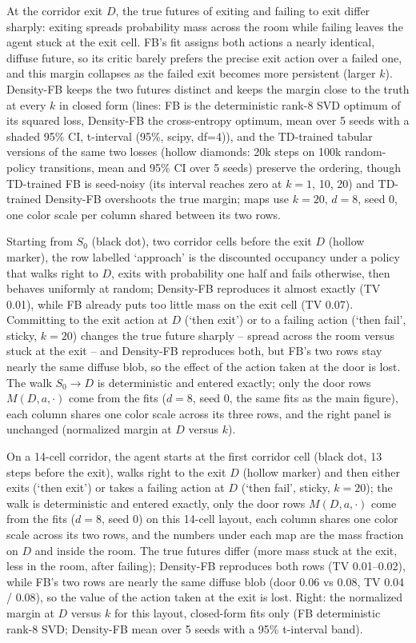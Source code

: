 At the corridor exit $D$, the true futures of exiting and failing to exit differ sharply: exiting spreads probability mass across the room while failing leaves the agent stuck at the exit cell. FB's fit assigns both actions a nearly identical, diffuse future, so its critic barely prefers the precise exit action over a failed one, and this margin collapses as the failed exit becomes more persistent (larger $k$). Density-FB keeps the two futures distinct and keeps the margin close to the truth at every $k$ in closed form (lines: FB is the deterministic rank-8 SVD optimum of its squared loss, Density-FB the cross-entropy optimum, mean over 5 seeds with a shaded 95\% CI, t-interval (95\%, scipy, df=4)), and the TD-trained tabular versions of the same two losses (hollow diamonds: 20k steps on 100k random-policy transitions, mean and 95\% CI over 5 seeds) preserve the ordering, though TD-trained FB is seed-noisy (its interval reaches zero at $k{=}1$, 10, 20) and TD-trained Density-FB overshoots the true margin; maps use $k{=}20$, $d{=}8$, seed 0, one color scale per column shared between its two rows.

Starting from $S_0$ (black dot), two corridor cells before the exit $D$ (hollow marker), the row labelled `approach' is the discounted occupancy under a policy that walks right to $D$, exits with probability one half and fails otherwise, then behaves uniformly at random; Density-FB reproduces it almost exactly (TV 0.01), while FB already puts too little mass on the exit cell (TV 0.07). Committing to the exit action at $D$ (`then exit') or to a failing action (`then fail', sticky, $k{=}20$) changes the true future sharply -- spread across the room versus stuck at the exit -- and Density-FB reproduces both, but FB's two rows stay nearly the same diffuse blob, so the effect of the action taken at the door is lost. The walk $S_0 \to D$ is deterministic and entered exactly; only the door rows $M(D,a,\cdot)$ come from the fits ($d{=}8$, seed 0, the same fits as the main figure), each column shares one color scale across its three rows, and the right panel is unchanged (normalized margin at $D$ versus $k$).

On a 14-cell corridor, the agent starts at the first corridor cell (black dot, 13 steps before the exit), walks right to the exit $D$ (hollow marker) and then either exits (`then exit') or takes a failing action at $D$ (`then fail', sticky, $k{=}20$); the walk is deterministic and entered exactly, only the door rows $M(D,a,\cdot)$ come from the fits ($d{=}8$, seed 0) on this 14-cell layout, each column shares one color scale across its two rows, and the numbers under each map are the mass fraction on $D$ and inside the room. The true futures differ (more mass stuck at the exit, less in the room, after failing); Density-FB reproduces both rows (TV 0.01--0.02), while FB's two rows are nearly the same diffuse blob (door 0.06 vs 0.08, TV 0.04 / 0.08), so the value of the action taken at the exit is lost. Right: the normalized margin at $D$ versus $k$ for this layout, closed-form fits only (FB deterministic rank-8 SVD; Density-FB mean over 5 seeds with a 95\% t-interval band).

